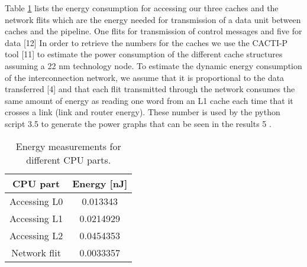 Table \ref{tab:energy} lists the energy consumption for accessing our three caches and the network
flits which are the energy needed for transmission of a data unit between caches and
the pipeline. One flits for transmission of control messages and five for data [12] \fixme
In order to retrieve the numbers for the caches we use the CACTI-P tool [11] \fixme to
estimate the power consumption of the different cache structures assuming a 22 nm
technology node. To estimate the dynamic energy consumption of the interconnection
network, we assume that it is proportional to the data transferred [4] \fixme and that each
flit transmitted through the network consumes the same amount of energy as reading
one word from an L1 cache each time that it crosses a link (link and router energy).
These number is used by the python script 3.5 \fixme to generate the power graphs that can be seen in the results 5 \fixme.
\begin{table}[h]
	\begin{centering}
		\begin{tabular}{ |c|c| }
			\hline
			CPU part & Energy [nJ] \\ \hline
			Accessing L0 & 0.013343 \\ \hline
			Accessing L1 & 0.0214929 \\ \hline
			Accessing L2 & 0.0454353 \\ \hline
			Network flit & 0.0033357 \\ \hline
		\end{tabular}
		\caption{Energy measurements for different CPU parts.}
		\label{tab:energy}
	\end{centering}
\end{table}








